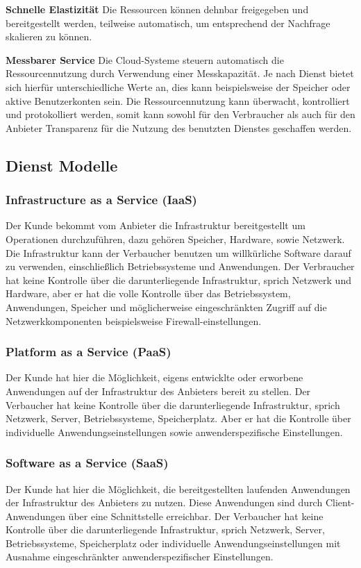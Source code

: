 \textbf{Schnelle Elastizität}
Die Ressourcen können dehnbar freigegeben und bereitgestellt werden, teilweise automatisch, um entsprechend der Nachfrage skalieren zu können\cite{nist_definition}.

\textbf{Messbarer Service}
Die Cloud-Systeme steuern automatisch die Ressourcennutzung durch Verwendung einer Messkapazität. Je nach Dienst bietet sich hierfür unterschiedliche Werte an, dies kann beispielsweise der Speicher oder aktive Benutzerkonten sein. Die Ressourcennutzung kann überwacht, kontrolliert und protokolliert werden, somit kann sowohl für den Verbraucher als auch für den Anbieter Transparenz für die Nutzung des benutzten Dienstes geschaffen werden\cite{nist_definition}.


\subsection{Dienst Modelle}
\subsubsection{Infrastructure as a Service (IaaS)} \label{IaaS}
Der Kunde bekommt vom Anbieter die Infrastruktur bereitgestellt um Operationen durchzuführen, dazu gehören Speicher, Hardware, sowie Netzwerk. Die Infrastruktur kann der Verbaucher benutzen um willkürliche Software darauf zu verwenden, einschließlich Betriebssysteme und Anwendungen. Der Verbraucher hat keine Kontrolle über die darunterliegende Infrastruktur, sprich Netzwerk und Hardware, aber er hat die volle Kontrolle über das Betriebssystem, Anwendungen, Speicher und möglicherweise eingeschränkten Zugriff auf die Netzwerkkomponenten beispielsweise Firewall-einstellungen\cite{nist_definition}.

\subsubsection{Platform as a Service (PaaS)} \label{PaaS} 
Der Kunde hat hier die Möglichkeit, eigens entwicklte oder erworbene Anwendungen auf der Infrastruktur des Anbieters bereit zu stellen. Der Verbaucher hat keine Kontrolle über die darunterliegende Infrastruktur, sprich Netzwerk, Server, Betriebssysteme, Speicherplatz. Aber er hat die Kontrolle über individuelle Anwendungseinstellungen sowie anwenderspezifische Einstellungen\cite{nist_definition}.

\subsubsection{Software as a Service (SaaS)} \label{SaaS}
Der Kunde hat hier die Möglichkeit, die bereitgestellten laufenden Anwendungen der Infrastruktur des Anbieters zu nutzen. Diese Anwendungen sind durch Client-Anwendungen über eine Schnittstelle erreichbar. Der Verbaucher hat keine Kontrolle über die darunterliegende Infrastruktur, sprich Netzwerk, Server, Betriebssysteme, Speicherplatz oder individuelle Anwendungseinstellungen mit Ausnahme eingeschränkter anwenderspezifischer Einstellungen\cite{nist_definition}.

